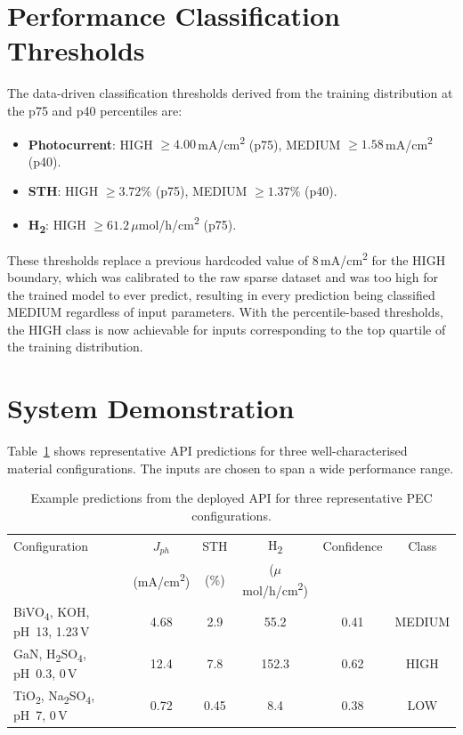 \section{Performance Classification Thresholds}

The data-driven classification thresholds derived from the training distribution
at the p75 and p40 percentiles are:

\begin{itemize}
  \item \textbf{Photocurrent}: HIGH $\geq 4.00$\,mA/cm\textsuperscript{2} (p75),
        MEDIUM $\geq 1.58$\,mA/cm\textsuperscript{2} (p40).
  \item \textbf{STH}: HIGH $\geq 3.72\%$ (p75), MEDIUM $\geq 1.37\%$ (p40).
  \item \textbf{H\textsubscript{2}}: HIGH $\geq 61.2$\,$\mu$mol/h/cm\textsuperscript{2} (p75).
\end{itemize}

These thresholds replace a previous hardcoded value of 8\,mA/cm\textsuperscript{2}
for the HIGH boundary, which was calibrated to the raw sparse dataset and was too
high for the trained model to ever predict, resulting in every prediction being
classified MEDIUM regardless of input parameters.
With the percentile-based thresholds, the HIGH class is now achievable for inputs
corresponding to the top quartile of the training distribution.

\section{System Demonstration}

Table~\ref{tab:demo} shows representative API predictions for three
well-characterised material configurations.
The inputs are chosen to span a wide performance range.

\begin{table}[htb]
\centering
\caption{Example predictions from the deployed API for three representative
         PEC configurations.}
\label{tab:demo}
\begin{tabular}{p{3.0cm}ccccc}
\toprule
Configuration &
  $J_{ph}$ &
  STH &
  H\textsubscript{2} &
  Confidence &
  Class \\
& (mA/cm\textsuperscript{2}) & (\%) &
  ($\mu$mol/h/cm\textsuperscript{2}) & & \\
\midrule
BiVO\textsubscript{4}, KOH, pH~13, 1.23\,V        & 4.68 & 2.9 & 55.2  & 0.41 & MEDIUM \\
GaN, H\textsubscript{2}SO\textsubscript{4}, pH~0.3, 0\,V & 12.4 & 7.8 & 152.3 & 0.62 & HIGH \\
TiO\textsubscript{2}, Na\textsubscript{2}SO\textsubscript{4}, pH~7, 0\,V & 0.72 & 0.45 & 8.4 & 0.38 & LOW \\
\bottomrule
\end{tabular}
\end{table}

